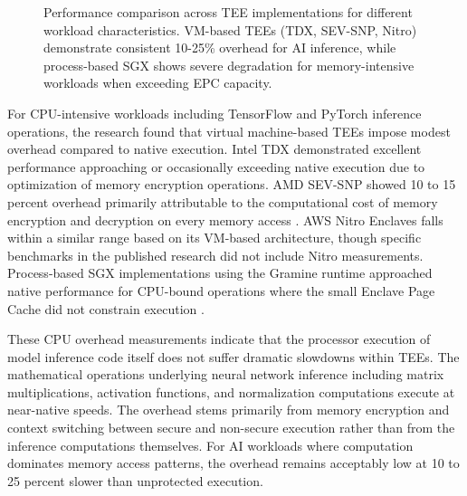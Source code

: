 \begin{figure}[htbp]
\caption{Performance comparison across TEE implementations for different workload characteristics. VM-based TEEs (TDX, SEV-SNP, Nitro) demonstrate consistent 10-25\% overhead for AI inference, while process-based SGX shows severe degradation for memory-intensive workloads when exceeding EPC capacity.}
\label{fig:performance_overhead}
\end{figure}

For CPU-intensive workloads including TensorFlow and PyTorch inference operations, the research found that virtual machine-based TEEs impose modest overhead compared to native execution. Intel TDX demonstrated excellent performance approaching or occasionally exceeding native execution due to optimization of memory encryption operations. AMD SEV-SNP showed 10 to 15 percent overhead primarily attributable to the computational cost of memory encryption and decryption on every memory access \cite{tee_evolution}. AWS Nitro Enclaves falls within a similar range based on its VM-based architecture, though specific benchmarks in the published research did not include Nitro measurements. Process-based SGX implementations using the Gramine runtime approached native performance for CPU-bound operations where the small Enclave Page Cache did not constrain execution \cite{gramine}.

These CPU overhead measurements indicate that the processor execution of model inference code itself does not suffer dramatic slowdowns within TEEs. The mathematical operations underlying neural network inference including matrix multiplications, activation functions, and normalization computations execute at near-native speeds. The overhead stems primarily from memory encryption and context switching between secure and non-secure execution rather than from the inference computations themselves. For AI workloads where computation dominates memory access patterns, the overhead remains acceptably low at 10 to 25 percent slower than unprotected execution.

